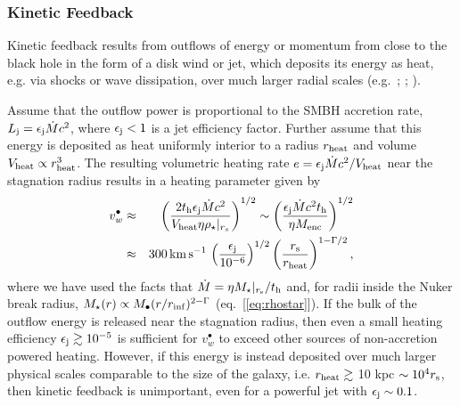 \documentclass[usenatbib,fleqn]{mn2e}
\begin{document}
\subsubsection{Kinetic Feedback}

Kinetic feedback results from outflows of energy or momentum from close to the black hole in the form of a disk wind or jet, which deposits its energy as heat, e.g. via shocks or wave dissipation, over much larger radial scales (e.g.~\citealt{McNamara&Nulsen07}; \citealt{Novak+11}; \citealt{Gaspari+12}).  

Assume that the outflow power is proportional to the SMBH accretion rate, $L_{\rm j} =
\epsilon_{\rm j} \dot{M}c^{2}$, where $\epsilon_{\rm j} < 1$ is a jet efficiency factor.  Further assume that this energy is deposited as heat uniformly interior to a radius $r_{\rm heat}$ and volume $V_{\rm heat} \propto r_{\rm
heat}^{3}$.  The resulting volumetric heating rate $e = \epsilon_{\rm
j}\dot{M}c^{2}/V_{\rm heat}$ near the stagnation radius results in a heating parameter given by
\begin{eqnarray} v_{w}^{\bullet} &\approx& \left(\frac{2t_{\rm
h}\epsilon_{\rm j}\dot{M}c^{2}}{V_{\rm heat}\eta
\rho_{\star}|_{r_{s}}}\right)^{1/2} \sim \left(\frac{\epsilon_{\rm
j}\dot{M}c^{2}t_{\rm h}}{\eta M_{\rm enc}}\right)^{1/2} \nonumber \\
&\approx& 300\,{\rm km\,s^{-1}}\,\left(\frac{\epsilon_{\rm j}}{10^{-6}}\right)^{1/2}\left(\frac{r_{\rm s}}{r_{\rm
heat}}\right)^{1-\Gamma/2},
\label{eq:vjet}
\end{eqnarray} 
where we have used the facts that $\dot{M} = \eta M_{\star}|_{r_{\rm s}}/t_{\rm h}$ and, for radii inside the Nuker break radius, $M_{\star}(r) \propto
M_{\bullet}(r/r_{\rm inf})^{2-\Gamma}$ (eq.~[\ref{eq:rhostar}]).  If the bulk of the outflow energy is released near the stagnation radius, then even a small heating efficiency $\epsilon_{\rm j} \gtrsim
10^{-5}$ is sufficient for $v_{w}^{\bullet}$ to exceed other sources of non-accretion powered heating.  However, if this energy is instead deposited over much larger physical scales comparable to the size of the galaxy, i.e. $r_{\rm heat} \gtrsim $ 10 kpc $\sim 10^{4}r_{\rm s}$, then kinetic feedback is unimportant, even for a powerful jet with $\epsilon_{\rm j} \sim 0.1$.  
\end{document}
